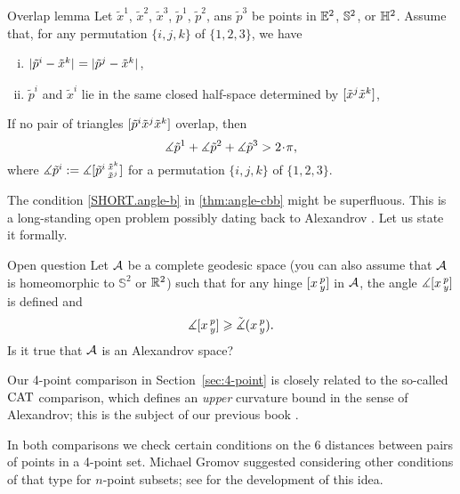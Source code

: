 \begin{thm}{Overlap lemma}\label{lem:extend-overlap}
Let $\tilde x^1$, $\tilde x^2$, $\tilde x^3$, $\tilde p^1$, $\tilde p^2$, ans $\tilde p^3$ be points in $\mathbb{E}^2$, $\mathbb{S}^2$, or $\mathbb{H}^2$.
Assume that, for any permutation $\{i,j,k\}$ of $\{1,2,3\}$, we have
\begin{enumerate}[(i)]

\item
\label{no-overlap:px=px}
$|{\tilde p^i}-{\tilde x^k}|_{}^{{}}=|{\tilde p^j}-{\tilde x^k}|_{}^{{}}$,

\item
\label{no-overlap:orient-1}
$\tilde p^i$ and $\tilde x^i$ lie in the same closed half-space determined by $[\tilde x^j\tilde x^k]$,
\end{enumerate}

If no pair of triangles $[\tilde p^i\tilde x^j\tilde x^k]$ overlap,
then
\[\mangle{\tilde p^1} +\mangle {\tilde p^2}+\mangle{\tilde p^3}> 2\cdot\pi,\]
where $\measuredangle\tilde p^i\mathrel{:=}\measuredangle[\tilde p^i\,{}^{\tilde x^k}_{\tilde x^j}]$
for a permutation $\{i,j,k\}$ of $\{1,2,3\}$.
\end{thm}

The condition \ref{SHORT.angle-b} in \ref{thm:angle-cbb} might be superfluous.
This is a long-standing open problem possibly dating back to Alexandrov \cite[footnote in 4.1.5]{burago-burago-ivanov}.
Let us state it formally.

\begin{thm}{Open question}\label{open:hinge-}
Let $\mathcal{A}$ be a complete geodesic space (you can also assume that $\mathcal{A}$ is homeomorphic to $\mathbb{S}^2$ or $\mathbb{R}^2$)
such that for any hinge $[x\,{}^{p}_{y}]$ in $\mathcal{A}$,
the angle $\measuredangle[x\,{}^{p}_{y}]$ is defined and
\[\measuredangle[x\,{}^{p}_{y}]\geqslant\tilde\measuredangle(x\,{}^{p}_{y}).\]
Is it true that $\mathcal{A}$ is an Alexandrov space?
\end{thm}

Our 4-point comparison in Section~\ref{sec:4-point} is closely related to the so-called $\mathrm{CAT}$ comparison, which defines an \textit{upper} curvature bound in the sense of Alexandrov;
this is the subject of our previous  book  \cite{alexander-kapovitch-petrunin-2019}.

In both comparisons we check certain conditions on the 6 distances between pairs of points in a 4-point set.
Michael Gromov \cite[Section 1.19$_+$]{gromov1999} suggested considering other conditions of that type for $n$-point subsets;
see \cite{toyoda,lebedeva-petrunin-zolotov,lebedeva2019,petrunin2017,lebedeva-petrunin2024,lebedeva-petrunin2023,lebedeva-petrunin2021,lebedeva-petrunin2025,eskenazis-mendel-naor,gromov2001} for the development of this idea.

